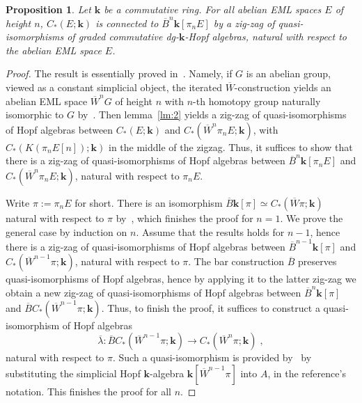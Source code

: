 \documentclass{amsart}
\newtheorem{proposition}[formula]{Proposition}
\theoremstyle{definition}
\theoremstyle{remark}
\def\k{\mathbf{k}}
\begin{document}
\begin{proposition}\label{pr:zigzagforEML}
	Let $\k$ be a commutative ring. For all abelian EML spaces $E$ of height $n$, $C_*(E;\k)$ is connected to $\overline{B}^n \k[\pi_nE]$ by a zig-zag of quasi-isomorphisms of graded commutative dg-$\k$-Hopf algebras, natural with respect to the abelian EML space $E$.
\end{proposition}
\begin{proof}
	The result is essentially proved in~\cite[Appendix~A]{gu-ma-74}. Namely, if $G$ is an abelian group, viewed as a constant simplicial object, the iterated $\overline{W}$-construction  yields an abelian EML space $\overline{W}^nG$ of height $n$ with $n$-th homotopy group naturally isomorphic to $G$ by~\cite[Proposition~A.21]{gu-ma-74}. Then lemma~\ref{lm:2} yields a zig-zag of quasi-isomorphisms of Hopf algebras between $C_*(E;\k)$ and $C_*(\overline{W}^n \pi_n E;\k)$, with $C_*(K(\pi_nE[n]);\k)$ in the middle of the zigzag.
	Thus, it suffices to show that there is a zig-zag of quasi-isomorphisms of Hopf algebras between $\overline{B}^n \k[\pi_nE]$ and $C_*(\overline{W}^n \pi_n E;\k)$, natural with respect to $\pi_nE$. 
	
	Write $\pi:=\pi_nE$ for short. There is an isomorphism $\overline{B}\k[\pi]\simeq C_*(\overline{W}\pi;\k)$ natural with respect to $\pi$ by~\cite[Lemma~A.15]{gu-ma-74}, which finishes the proof 
	for $n=1$. We prove the general case by induction on $n$. Assume that the results holds for $n-1$, hence there is a zig-zag of quasi-isomorphisms of Hopf algebras between $\overline{B}^{n-1}\k[\pi]$ and $C_*(\overline{W}^{n-1}\pi;\k)$, natural with respect to $\pi$. The bar construction $\overline{B}$ preserves quasi-isomorphisms of Hopf algebras, hence by applying it to the latter zig-zag we obtain a new zig-zag of quasi-isomorphisms of Hopf algebras between $\overline{B}^{n}\k[\pi]$ and $\overline{B}C_*(\overline{W}^{n-1}\pi;\k)$. Thus, to finish the proof, it suffices to construct a quasi-isomorphism of Hopf algebras 
	\[
    \overline{\lambda}\colon \overline{B}C_*(\overline{W}^{n-1}\pi;\k)\to C_*(\overline{W}^{n}\pi;\k)\;,
    \]
	natural with respect to $\pi$. 
	Such a quasi-isomorphism is provided by~\cite[Theorem~A.20]{gu-ma-74} by substituting the simplicial Hopf $\k$-algebra $\k[\overline{W}^{n-1}\pi]$ into $A$, in the reference's notation. This finishes the proof for all $n$.
	

\end{proof}
\end{document}
